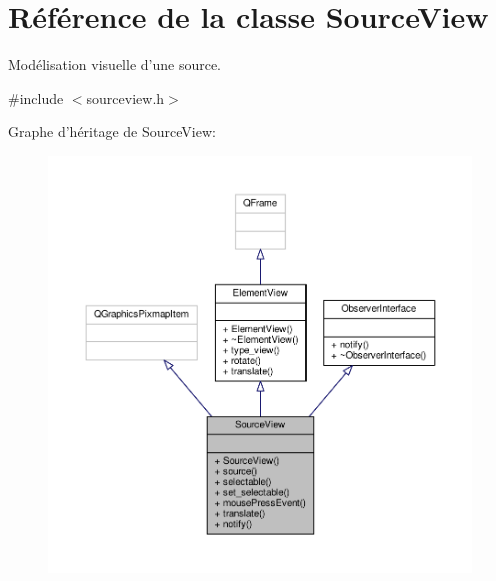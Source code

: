 \hypertarget{classSourceView}{\section{Référence de la classe Source\+View}
\label{classSourceView}
}


Modélisation visuelle d’une source.  




{\ttfamily \#include $<$sourceview.\+h$>$}



Graphe d'héritage de Source\+View\+:
\nopagebreak
\begin{figure}[H]
\begin{center}
\leavevmode
\includegraphics[width=350pt]{de/ddc/classSourceView__inherit__graph}
\end{center}
\end{figure}


